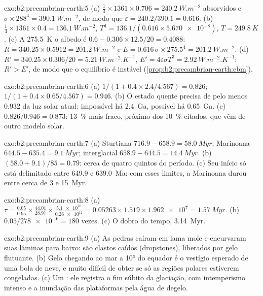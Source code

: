 \begin{solution}{exo:b2:precambrian-earth:5}
(a) $\tfrac14\times1361\times0.706 = \qty{240.2}{W.m^{-2}}$ absorvidos e $\sigma\times288^4 =
\qty{390.1}{W.m^{-2}}$, de modo que $\varepsilon = 240.2/390.1 = 0.616$. (b) $\tfrac14\times1361\times0.4
= \qty{136.1}{W.m^{-2}}$, $T^4 = 136.1/(0.616\times\num{5.670e-8})$, $T = \qty{249.8}{K}$.
(c) A \qty{275.5}{K} o albedo é $0.6 - 0.306\times12.5/20 = 0.4088$: $R = 340.25\times0.5912 =
\qty{201.2}{W.m^{-2}}$ e $E = 0.616\,\sigma\times275.5^4 = \qty{201.2}{W.m^{-2}}$. (d) $R' =
340.25\times0.306/20 = \qty{5.21}{W.m^{-2}.K^{-1}}$, $E' = 4\varepsilon\sigma T^3 =
\qty{2.92}{W.m^{-2}.K^{-1}}$: $R' > E'$, de modo que o equilíbrio é instável
(\cref{prop:b2:precambrian-earth:ebm}).
\end{solution}

\begin{solution}{exo:b2:precambrian-earth:6}
(a) $1/(1 + 0.4\times2.4/4.567) = 0.826$; $1/(1 + 0.4\times0.65/4.567) = 0.946$. (b) O estado
quente precisa de pelo menos 0.932 da luz solar atual: impossível há \qty{2.4}{Ga}, possível
há \qty{0.65}{Ga}. (c) $0.826/0.946 = 0.873$: \qty{13}{\percent} mais fraco, próximo dos
\qty{10}{\percent} citados, que vêm de outro modelo solar.
\end{solution}

\begin{solution}{exo:b2:precambrian-earth:7}
(a) Sturtiana $716.9 - 658.9 = \qty{58.0}{Myr}$; Marinoana $644.5 - 635.4 = \qty{9.1}{Myr}$;
interglacial $658.9 - 644.5 = \qty{14.4}{Myr}$. (b) $(58.0 + 9.1)/85 = 0.79$: cerca de quatro quintos
do período. (c) Seu início só está delimitado entre 649.9 e \qty{639.0}{Ma}: com esses
limites, a Marinoana durou entre cerca de 3 e \qty{15}{Myr}.
\end{solution}

\begin{solution}{exo:b2:precambrian-earth:8}
(a) $\tau = \frac{0.05}{0.95}\times\frac{44.01}{28.97}\times\frac{\num{5.1e18}}{\num{0.26e12}} =
0.05263\times1.519\times\num{1.962e7} = \qty{1.57}{Myr}$. (b) $0.05/\num{278e-6} = 180$ vezes.
(c) O dobro do tempo, \qty{3.14}{Myr}.
\end{solution}

\begin{solution}{exo:b2:precambrian-earth:9}
(a) As pedras caíram em lama mole e encurvaram suas lâminas para baixo: são clastos caídos (dropstones), liberados por
gelo flutuante. (b) Gelo chegando ao mar a \ang{10} do equador é o vestígio esperado de uma
bola de neve, e muito difícil de obter se só as regiões polares estiverem congeladas. (c) Um :
ele registra o fim súbito da glaciação, com intemperismo intenso e a inundação das
plataformas pela água de degelo.
\end{solution}

